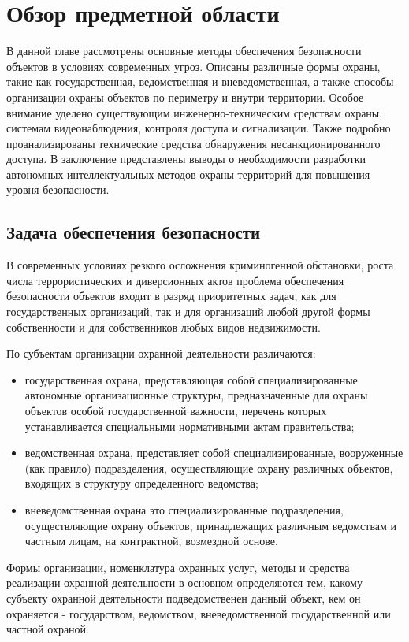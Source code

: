 \chapter{Обзор предметной области} \label{ch1}

В данной главе рассмотрены основные методы обеспечения безопасности объектов в условиях современных угроз. Описаны различные формы охраны, такие как государственная, ведомственная и вневедомственная, а также способы организации охраны объектов по периметру и внутри территории. Особое внимание уделено существующим инженерно-техническим средствам охраны, системам видеонаблюдения, контроля доступа и сигнализации. Также подробно проанализированы технические средства обнаружения несанкционированного доступа. В заключение представлены выводы о необходимости разработки автономных интеллектуальных методов охраны территорий для повышения уровня безопасности\cite{obespech-bezopasnosti}.


\section{Задача обеспечения безопасности} \label{ch1:sec1}

В современных условиях резкого осложнения криминогенной обстановки, роста числа террористических и диверсионных актов проблема обеспечения безопасности объектов входит в разряд приоритетных задач, как для государственных организаций, так и для организаций любой другой формы собственности и для собственников любых видов недвижимости.

По субъектам организации охранной деятельности различаются:
\begin{itemize}
    \item государственная охрана, представляющая собой специализированные автономные организационные структуры, предназначенные для охраны объектов особой государственной важности, перечень которых устанавливается специальными нормативными актам правительства;
    \item ведомственная охрана, представляет собой специализированные, вооруженные (как правило) подразделения, осуществляющие охрану различных объектов, входящих в структуру определенного ведомства;
    \item вневедомственная охрана это специализированные подразделения, осуществляющие охрану объектов, принадлежащих различным ведомствам и частным лицам, на контрактной, возмездной основе.
\end{itemize}

Формы организации, номенклатура охранных услуг, методы и средства реализации охранной деятельности в основном определяются тем, какому субъекту охранной деятельности подведомственен данный объект, кем он охраняется - государством, ведомством, вневедомственной государственной или частной охраной.

